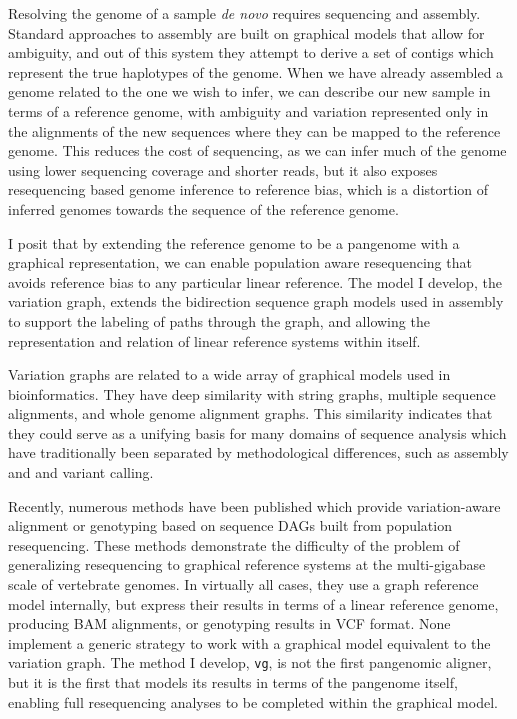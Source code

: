 Resolving the genome of a sample \emph{de novo} requires sequencing and assembly.
Standard approaches to assembly are built on graphical models that allow for ambiguity, and out of this system they attempt to derive a set of contigs which represent the true haplotypes of the genome.
When we have already assembled a genome related to the one we wish to infer, we can describe our new sample in terms of a reference genome, with ambiguity and variation represented only in the alignments of the new sequences where they can be mapped to the reference genome.
This reduces the cost of sequencing, as we can infer much of the genome using lower sequencing coverage and shorter reads, but it also exposes resequencing based genome inference to reference bias, which is a distortion of inferred genomes towards the sequence of the reference genome.

I posit that by extending the reference genome to be a pangenome with a graphical representation, we can enable population aware resequencing that avoids reference bias to any particular linear reference.
The model I develop, the variation graph, extends the bidirection sequence graph models used in assembly to support the labeling of paths through the graph, and allowing the representation and relation of linear reference systems within itself.

Variation graphs are related to a wide array of graphical models used in bioinformatics.
They have deep similarity with string graphs, multiple sequence alignments, and whole genome alignment graphs.
This similarity indicates that they could serve as a unifying basis for many domains of sequence analysis which have traditionally been separated by methodological differences, such as assembly and and variant calling.

Recently, numerous methods have been published which provide variation-aware alignment or genotyping based on sequence DAGs built from population resequencing.
These methods demonstrate the difficulty of the problem of generalizing resequencing to graphical reference systems at the multi-gigabase scale of vertebrate genomes.
In virtually all cases, they use a graph reference model internally, but express their results in terms of a linear reference genome, producing BAM alignments, or genotyping results in VCF format.
None implement a generic strategy to work with a graphical model equivalent to the variation graph.
The method I develop, {\tt vg}, is not the first pangenomic aligner, but it is the first that models its results in terms of the pangenome itself, enabling full resequencing analyses to be completed within the graphical model.

